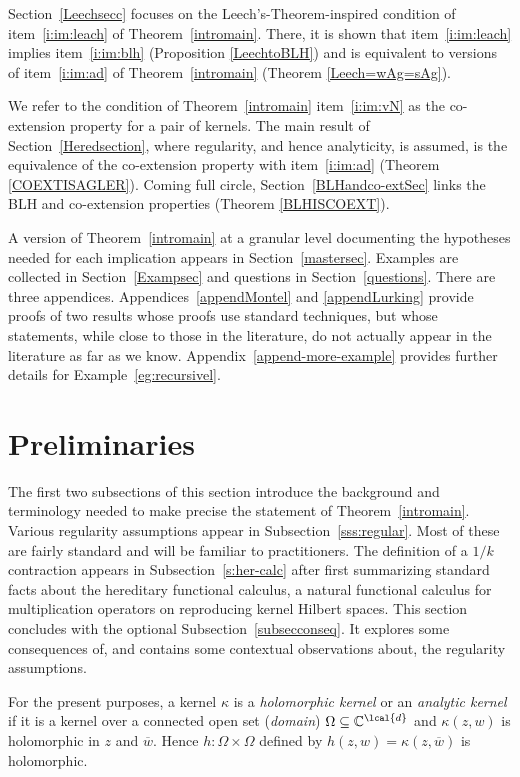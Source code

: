 \documentclass[a4paper,reqno,index]{amsart}
\newcommand{\df}[1]{{\textit{#1}}{\index{#1}}}
\numberwithin{equation}{section}
\newcommand{\CC}{\mathbb{C}}
\newcommand{\genk}{\kappa} %
\theoremstyle{definition}
\begin{document}
 Section~\ref{Leechsecc} focuses on the
 Leech's-Theorem-inspired 
 condition of item~\ref{i:im:leach} of Theorem~\ref{intromain}.
 There, it is shown that 
 item~\ref{i:im:leach} implies item~\ref{i:im:blh} (Proposition \ref{LeechtoBLH}) and is equivalent to versions of item~\ref{i:im:ad} of Theorem~\ref{intromain} (Theorem \ref{Leech=wAg=sAg}).
 

 We refer to the condition of Theorem~\ref{intromain} item~\ref{i:im:vN} as the co-extension property for a pair of kernels.  The main result  of Section~\ref{Heredsection}, where regularity, and hence analyticity, is assumed, is the equivalence of the co-extension property with item~\ref{i:im:ad} (Theorem \ref{COEXTISAGLER}). Coming full circle, Section~\ref{BLHandco-extSec} links the  BLH and co-extension properties (Theorem \ref{BLHISCOEXT}).  

 A version of Theorem~\ref{intromain} at a granular level documenting the hypotheses needed for each implication appears in Section~\ref{mastersec}. Examples are collected in Section~\ref{Exampsec} and questions in Section~\ref{questions}.  There are  three appendices. 
 Appendices~\ref{appendMontel} and \ref{appendLurking} provide proofs of two results whose proofs use standard techniques, but whose statements, while close to those in the literature, do not actually appear in the literature as far as we know.  Appendix~\ref{append-more-example}
 provides further details for Example~\ref{eg:recursivel}.
 

\section{Preliminaries} 
\label{prelims}
 The first two subsections of this section introduce the background and terminology  needed to make  precise the  statement of Theorem~\ref{intromain}. 
 Various regularity assumptions appear in Subsection~\ref{sss:regular}. Most of these are fairly standard and will be familiar to practitioners. 
 The definition of 
  a $1/k$ contraction appears in  Subsection~\ref{s:her-calc} after first summarizing 
   standard facts  about the hereditary functional calculus, a natural functional calculus for multiplication operators on 
   reproducing kernel Hilbert spaces.  This section 
  concludes with the optional Subsection~\ref{subsecconseq}. It explores some consequences of, and contains some contextual observations about, the regularity assumptions. 
 

  
  
 For the present purposes, a kernel $\genk$ is a \df{holomorphic kernel} or  an \df{analytic kernel}  if it is a kernel
 over a connected open set (\df{domain})  $\Omega\subseteq \CC^{\lcal{d}}$  and
 $\kappa(z,w)$ is holomorphic in $z$ and $\overline{w}.$ Hence $h:\Omega\times \Omega$ 
 defined by $h(z,w)=\kappa(z,\overline{w})$ is holomorphic. 
 
\end{document}
